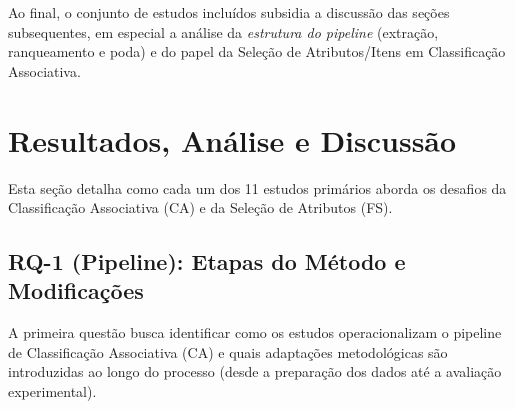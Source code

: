 \noindent Ao final, o conjunto de estudos incluídos subsidia a discussão das seções subsequentes,
em especial a análise da \textit{estrutura do pipeline} (extração, ranqueamento e poda) e do papel da
Seleção de Atributos/Itens em Classificação Associativa.



\section{Resultados, Análise e Discussão}\label{sec:resultados_analise_discussao}

Esta seção detalha como cada um dos 11 estudos primários aborda os desafios da Classificação Associativa (CA) e da Seleção de Atributos (FS).

\subsection{RQ-1 (Pipeline): Etapas do Método e Modificações}
A primeira questão busca identificar como os estudos operacionalizam o pipeline de Classificação Associativa (CA) e quais adaptações metodológicas são introduzidas ao longo do processo (desde a preparação dos dados até a avaliação experimental).

\footnotesize
\setlength{\tabcolsep}{4pt}
\renewcommand{\arraystretch}{1.15}

